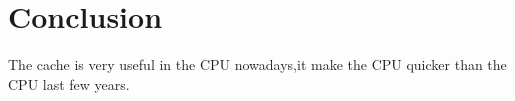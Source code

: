 \documentclass[12pt,a4paper]{article}
\begin{document}

\section{Conclusion}

The cache is very useful in the CPU nowadays,it make the CPU quicker than the CPU last few years.
\end{document}

